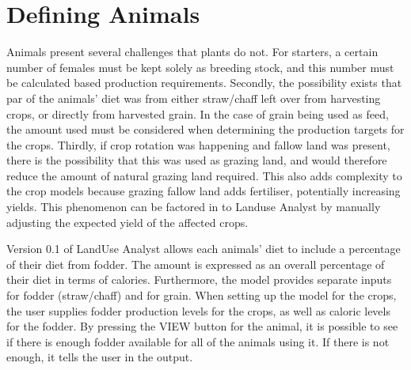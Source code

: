 \section{Defining Animals}
  \label{definingAnimals}
Animals present several challenges that plants do not.  For starters, a certain
number of females must be kept solely as breeding stock, and this number must be
calculated based production requirements.  Secondly, the possibility exists that
par of the animals' diet was from either straw/chaff left over from harvesting
crops, or directly from harvested grain.  In the case of grain being used as
feed, the amount used must be considered when determining the production targets
for the crops.  Thirdly, if crop rotation was happening and fallow land was
present, there is the possibility that this was used as grazing land, and would
therefore reduce the amount of natural grazing land required.  This also adds
complexity to the crop models because grazing fallow land adds fertiliser,
potentially increasing yields.  This phenomenon can be factored in to Landuse
Analyst by manually adjusting the expected yield of the affected crops.

Version 0.1 of LandUse Analyst allows each animals' diet to include a percentage
of their diet from fodder.  The amount is expressed as an overall percentage of
their diet in terms of calories.  Furthermore, the model provides separate
inputs for fodder (straw/chaff) and for grain.  When setting up the model for
the crops, the user supplies fodder production levels for the crops, as well as
caloric levels for the fodder.  By pressing the VIEW button for the animal, it
is possible to see if there is enough fodder available for all of the animals
using it.  If there is not enough, it tells the user in the output.

